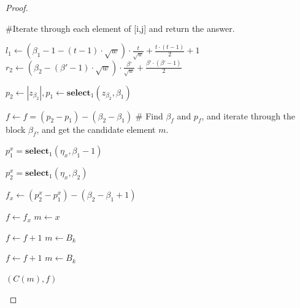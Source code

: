 \documentclass[runningheads]{llncs}
\begin{document}
\begin{proof}
\begin{algorithm}[H]
\begin{algorithmic}[1]
        \State \#Iterate through each element of [i,j] and return the answer.
        
        \EndIf

        
        \State $l_1 \gets (\beta_1-1 - (t-1) \cdot \sqrt{w}) \cdot \frac{t}{\sqrt{w}}+\frac{t\cdot (t-1)}{2}+1$
        \State $r_2 \gets (\beta_2 - (\beta'-1) \cdot \sqrt{w}) \cdot \frac{\beta'}{\sqrt{w}}+\frac{\beta'\cdot (\beta'-1)}{2}$
        
        \State $p_2 \gets |z_{\beta_2}|, p_1\gets \textbf{select}_1(z_{\beta_2}, \beta_1)$

        \State $f \gets f = ( p_2 - p_1 )-( \beta_2 - \beta_1 )$ 
        \State \# Find $\beta_f$ and $p_f$, and iterate through the block $\beta_f$, and get the candidate element $m$.


            \State $p_1^x=\textbf{select}_1(\eta_x,\beta_1-1)$

            \State $p_2^x = \textbf{select}_1(\eta_x, \beta_2 )$
          
            \State $f_x\gets (p_2^x-p_1^x)-(\beta_2-\beta_1+1)$
            
            \State $f\gets f_x$
            \State $m\gets x$
            \EndIf
            \EndFor
        

        
                \State $f\gets f+1$
                \State $m\gets B_k$
            \EndWhile
        \EndFor
    
                \State $f\gets f+1$
                \State $m\gets B_k$
            \EndWhile
        \EndFor
    
        \Return $(C(m),f)$
    
        \EndFunction
        \end{algorithmic}
    \end{algorithm}

\end{proof}
\end{document}
